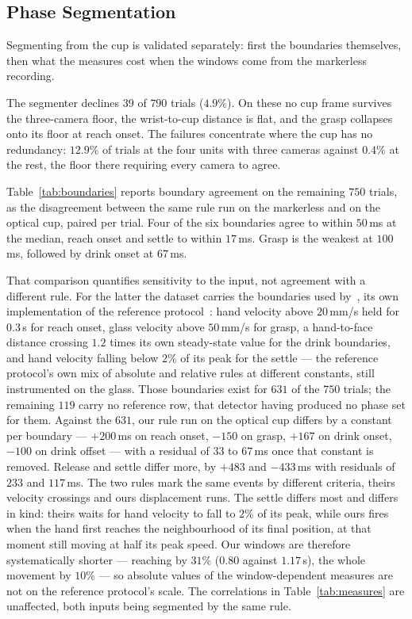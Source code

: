 \documentclass[conference]{IEEEtran}
\begin{document}



\subsection{Phase Segmentation}
\label{sec:results-seg}
Segmenting from the cup is validated separately: first the boundaries themselves,
then what the measures cost when the windows come from the markerless recording.

The segmenter declines $39$ of $790$ trials ($4.9\%$). On these no cup frame
survives the three-camera floor, the wrist-to-cup distance is flat, and the grasp
collapses onto its floor at reach onset. The failures concentrate where the cup
has no redundancy: $12.9\%$ of trials at the four units with three cameras
against $0.4\%$ at the rest, the floor there requiring every camera to agree.

Table~\ref{tab:boundaries} reports boundary agreement on the remaining $750$
trials, as the disagreement between the same rule run on the markerless and on
the optical cup, paired per trial.
Four of the six boundaries agree to within $50$\,ms at the median, reach onset
and settle to within $17$\,ms. Grasp is the weakest at $100$\,ms, followed by
drink onset at $67$\,ms.

That comparison quantifies sensitivity to the input, not agreement with a
different rule. For the latter the dataset carries the boundaries used
by~\cite{unger2024}, its own implementation of the reference
protocol~\cite{altmurphy2018}: hand velocity above $20$\,mm/s held for $0.3$\,s
for reach onset, glass velocity above $50$\,mm/s for grasp, a hand-to-face
distance crossing $1.2$ times its own steady-state value for the drink
boundaries, and hand velocity falling below $2\%$ of its peak for the settle ---
the reference protocol's own mix of absolute and relative rules at different
constants, still instrumented on the glass. Those
boundaries exist for $631$ of the $750$ trials; the remaining $119$ carry no
reference row, that detector having produced no phase set for them. Against the
$631$, our rule run on the optical cup differs by a constant per boundary ---
$+200$\,ms on reach onset, $-150$ on grasp, $+167$ on drink onset, $-100$ on
drink offset --- with a residual of $33$ to $67$\,ms once that constant is
removed. Release and settle differ more, by $+483$ and $-433$\,ms with residuals
of $233$ and $117$\,ms. The two rules mark the same events by different
criteria, theirs velocity crossings and ours displacement runs. The settle differs
most and differs in kind: theirs waits for hand velocity to fall to $2\%$ of its
peak, while ours fires when the hand first reaches the neighbourhood of its final
position, at that moment still moving at half its peak speed. Our windows are
therefore systematically shorter --- reaching by $31\%$ ($0.80$ against $1.17$\,s), the
whole movement by $10\%$ --- so absolute values of the window-dependent measures
are not on the reference protocol's scale. The correlations in
Table~\ref{tab:measures} are unaffected, both inputs being segmented by the same
rule.
\end{document}
